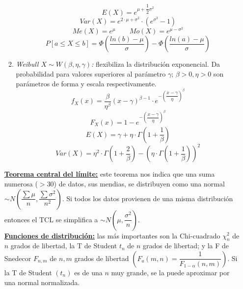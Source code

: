 \documentclass[a4paper, twocolumn, 10pt]{article}
\begin{document}
\begin{itemize}
\begin{enumerate}
		\begin{equation*}
			E(X) = e^{\mu+\dfrac{1}{2}\sigma^2}
		\end{equation*}
		\begin{equation*}
			Var(X) = e^{2\cdot \mu + \sigma^2}\cdot (e^{\sigma^2}-1)
		\end{equation*}
		\begin{equation*}
			Me(X) = e^\mu \qquad Mo(X) = e^{\mu - \sigma^2}
		\end{equation*}
		\begin{equation*}
			P\left[a \leq X \leq b\right] = \Phi\left(\dfrac{ln(b)-\mu}{\sigma}\right)-\Phi\left(\dfrac{ln(a)-\mu}{\sigma}\right)
		\end{equation*}
		\item \textit{Weibull $X \sim W(\beta, \eta, \gamma)$:} flexibiliza la distribución exponencial. Da probabilidad para valores superiores al parámetro $\gamma$; $\beta >0, \eta >0$ son parámetros de forma y escala respectivamente.
		\begin{equation*}
			f_X(x) = \frac{\beta}{\eta^\beta}(x-\gamma)^{\beta-1}\cdot e^{-\left(\dfrac{x-\gamma}{\eta}\right)^\beta}
		\end{equation*}
		\begin{equation*}
			F_X(x) = 1 - e^{-\left(\dfrac{x-\gamma}{\eta}\right)^\beta}
		\end{equation*}
		\begin{equation*}
			E(X) = \gamma + \eta \cdot \Gamma\left(1 + \dfrac{1}{\beta}\right)		
		\end{equation*}
		\begin{equation*}
			Var(X) = \eta^2 \cdot \Gamma\left(1 + \dfrac{2}{\beta}\right)- \left(\eta\cdot \Gamma\left(1+ \dfrac{1}{\beta}\right)\right)^2
		\end{equation*}
	\end{enumerate}
\textbf{\underline{Teorema central del límite:}} este teorema nos indica que una suma numerosa ($>$30) de datos, sus mendias, se distribuyen como una normal $\sim N\left(\dfrac{\sum \mu}{n}, \dfrac{\sum\sigma^2}{n^2}\right)$. Si todos los datos provienen de una misma distribución entonces el TCL se simplifica a $\sim N\left(\mu, \dfrac{\sigma^2}{n}\right)$. \\
\underline{\textbf{Funciones de distribución:}} las más importantes son la Chi-cuadrado $\chi^2_n$ de $n$ grados de libertad, la T de Student $t_n$ de $n$ grados de libertad; y la F de Snedecor $F_{n,m}$ de $n,m$ grados de libertad $\left(F_a(m,n) = \dfrac{1}{F_{1-\alpha}(n,m)}\right)$. Si la T de Student $(t_n)$ es de una $n$ muy grande, se la puede aproximar por una normal normalizada.
\end{itemize}
\end{document}
